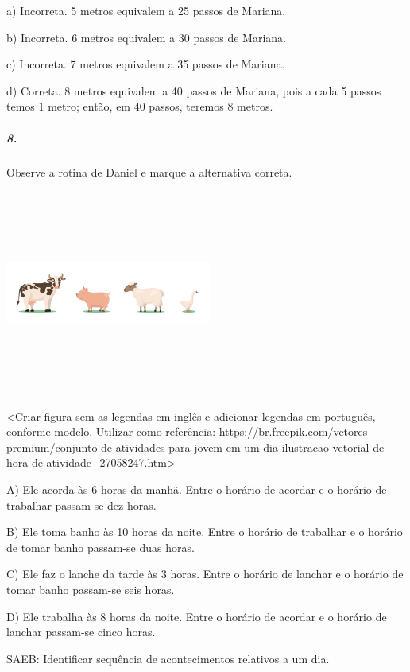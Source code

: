 a) Incorreta. 5 metros equivalem a 25 passos de Mariana.

b) Incorreta. 6 metros equivalem a 30 passos de Mariana.

c) Incorreta. 7 metros equivalem a 35 passos de Mariana.

d) Correta. 8 metros equivalem a 40 passos de Mariana, pois a cada 5
passos temos 1 metro; então, em 40 passos, teremos 8 metros.

\subparagraph{8. }\label{section-107}

Observe a rotina de Daniel e marque a alternativa correta.

\includegraphics[width=2.66667in,height=2.65556in]{media/image116.png}

\textless{}Criar figura sem as legendas em inglês e adicionar legendas
em português, conforme modelo. Utilizar como referência:
\url{https://br.freepik.com/vetores-premium/conjunto-de-atividades-para-jovem-em-um-dia-ilustracao-vetorial-de-hora-de-atividade_27058247.htm}\textgreater{}

A) Ele acorda às 6 horas da manhã. Entre o horário de acordar e o horário de trabalhar passam-se dez horas.

B) Ele toma banho às 10 horas da noite. Entre o horário de trabalhar e o horário de tomar banho passam-se duas horas.

C) Ele faz o lanche da tarde às 3 horas. Entre o horário de lanchar e o horário de tomar banho passam-se seis horas.

D) Ele trabalha às 8 horas da noite. Entre o horário de acordar e o horário de lanchar passam-se cinco horas.

SAEB: Identificar sequência de acontecimentos relativos a um dia.

